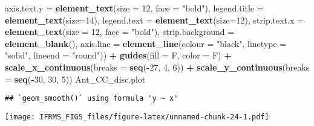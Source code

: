 \documentclass[
]{article}
\newenvironment{Shaded}{\begin{snugshade}}{\end{snugshade}}
\newcommand{\DataTypeTok}[1]{\textcolor[rgb]{0.13,0.29,0.53}{#1}}
\newcommand{\DecValTok}[1]{\textcolor[rgb]{0.00,0.00,0.81}{#1}}
\newcommand{\KeywordTok}[1]{\textcolor[rgb]{0.13,0.29,0.53}{\textbf{#1}}}
\newcommand{\NormalTok}[1]{#1}
\newcommand{\OperatorTok}[1]{\textcolor[rgb]{0.81,0.36,0.00}{\textbf{#1}}}
\newcommand{\StringTok}[1]{\textcolor[rgb]{0.31,0.60,0.02}{#1}}
\begin{document}
\begin{Shaded}
\begin{Highlighting}[]
        \DataTypeTok{axis.text.y =} \KeywordTok{element_text}\NormalTok{(}\DataTypeTok{size =} \DecValTok{12}\NormalTok{, }\DataTypeTok{face =} \StringTok{"bold"}\NormalTok{),}
        \DataTypeTok{legend.title =} \KeywordTok{element_text}\NormalTok{(}\DataTypeTok{size=}\DecValTok{14}\NormalTok{), }
        \DataTypeTok{legend.text =} \KeywordTok{element_text}\NormalTok{(}\DataTypeTok{size=}\DecValTok{12}\NormalTok{),}
        \DataTypeTok{strip.text.x =} \KeywordTok{element_text}\NormalTok{(}\DataTypeTok{size =} \DecValTok{12}\NormalTok{, }\DataTypeTok{face =} \StringTok{"bold"}\NormalTok{),}
        \DataTypeTok{strip.background =} \KeywordTok{element_blank}\NormalTok{(),}
        \DataTypeTok{axis.line =} \KeywordTok{element_line}\NormalTok{(}\DataTypeTok{colour =} \StringTok{"black"}\NormalTok{, }\DataTypeTok{linetype =} \StringTok{"solid"}\NormalTok{, }\DataTypeTok{lineend =} \StringTok{"round"}\NormalTok{)) }\OperatorTok{+}
\StringTok{  }\KeywordTok{guides}\NormalTok{(}\DataTypeTok{fill =}\NormalTok{ F, }\DataTypeTok{color =}\NormalTok{ F) }\OperatorTok{+}\StringTok{ }
\StringTok{  }\KeywordTok{scale_x_continuous}\NormalTok{(}\DataTypeTok{breaks =} \KeywordTok{seq}\NormalTok{(}\OperatorTok{-}\DecValTok{27}\NormalTok{, }\DecValTok{4}\NormalTok{, }\DecValTok{6}\NormalTok{)) }\OperatorTok{+}\StringTok{ }
\StringTok{  }\KeywordTok{scale_y_continuous}\NormalTok{(}\DataTypeTok{breaks =} \KeywordTok{seq}\NormalTok{(}\OperatorTok{-}\DecValTok{30}\NormalTok{, }\DecValTok{30}\NormalTok{, }\DecValTok{5}\NormalTok{))}
\NormalTok{Ant_CC_disc.plot}
\end{Highlighting}
\end{Shaded}

\begin{verbatim}
## `geom_smooth()` using formula 'y ~ x'
\end{verbatim}

\texttt{[image: IFRMS\_FIGS\_files/figure-latex/unnamed-chunk-24-1.pdf]}
\end{document}
